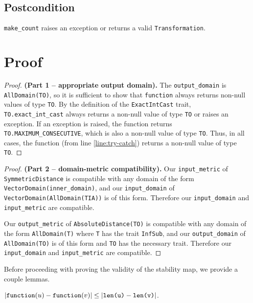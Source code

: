 \documentclass{article}
\begin{document}
\subsection*{Postcondition}
\texttt{make\_count} raises an exception or returns a valid \texttt{Transformation}.

\section{Proof}


\begin{proof} \textbf{(Part 1 -- appropriate output domain).}
    The \texttt{output\_domain} is \texttt{AllDomain(TO)}, so it is sufficient to show that \texttt{function} always returns non-null values of type \texttt{TO}.
    By the definition of the \texttt{ExactIntCast} trait, \texttt{TO.exact\_int\_cast} always returns a non-null value of type \texttt{TO} or raises an exception.
    If an exception is raised, the function returns \texttt{TO.MAXIMUM\_CONSECUTIVE}, which is also a non-null value of type \texttt{TO}.
    Thus, in all cases, the function (from line \ref{line:try-catch}) returns a non-null value of type \texttt{TO}.
\end{proof}

\begin{proof} \textbf{(Part 2 -- domain-metric compatibility).}
    Our \texttt{input\_metric} of \texttt{SymmetricDistance} is compatible with any domain of the form \texttt{VectorDomain(inner\_domain)}, 
    and our \texttt{input\_domain} of \\\texttt{VectorDomain(AllDomain(TIA))} is of this form. 
    Therefore our \texttt{input\_domain} and \texttt{input\_metric} are compatible.

    Our \texttt{output\_metric} of \texttt{AbsoluteDistance(TO)} is compatible with any domain of the form \texttt{AllDomain(T)} where \texttt{T} has the trait \texttt{InfSub}, 
    and our \texttt{output\_domain} of \texttt{AllDomain(TO)} is of this form and \texttt{TO} has the necessary trait.
    Therefore our \texttt{input\_domain} and \texttt{input\_metric} are compatible.
\end{proof}

Before proceeding with proving the validity of the stability map, we provide a couple lemmas.

\begin{lemma}
    \label{dsym-sens}
    $|\texttt{function}(u) - \texttt{function}(v)| \leq |\texttt{len(u)} - \texttt{len(v)}|$.
\end{lemma}
\end{document}
